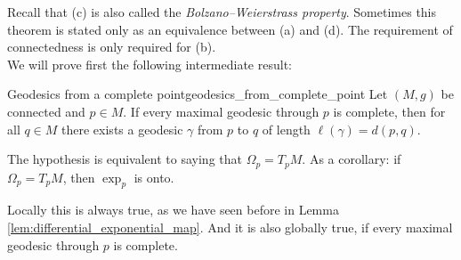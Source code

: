 Recall that (c) is also called the \emph{Bolzano--Weierstrass property}. Sometimes this theorem is stated only as an equivalence between (a) and (d). The requirement of connectedness is only required for (b).\\

We will prove first the following intermediate result:

\begin{colorlem}{Geodesics from a complete point}{geodesics_from_complete_point}
Let $(M,g)$ be connected and $p \in M$. If every maximal geodesic through $p$ is complete, then for all $q \in M$ there exists a geodesic $\gamma$ from $p$ to $q$ of length $\ell(\gamma) = d(p,q)$.
\end{colorlem}

\begin{colremark}{}{}
The hypothesis is equivalent to saying that $\Omega_p = T_pM$. As a corollary: if $\Omega_p = T_pM$, then $\exp_p$ is onto.
\end{colremark}

Locally this is always true, as we have seen before in Lemma \ref{lem:differential_exponential_map}. And it is also globally true, if every maximal geodesic through $p$ is complete. 









